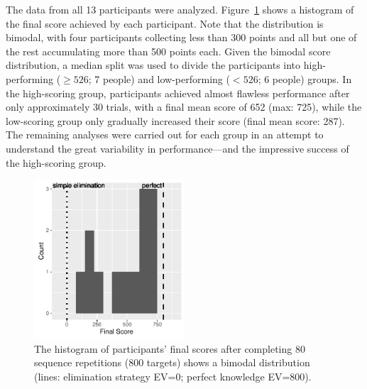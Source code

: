 \documentclass[man,floatsintext]{apa6}
\begin{document}



The data from all 13 participants were analyzed. Figure~\ref{fig:score-hist} shows a histogram of the final score achieved by each participant. Note that the distribution is bimodal, with four participants collecting less than 300 points and all but one of the rest accumulating more than 500 points each. Given the bimodal score distribution, a median split was used to divide the participants into high-performing ($\geq526$; 7 people) and low-performing ($<526$; 6 people) groups. In the high-scoring group, participants achieved almost flawless performance after only approximately 30 trials, with a final mean score of 652 (max: 725), while the low-scoring group only gradually increased their score (final mean score: 287). The remaining analyses were carried out for each group in an attempt to understand the great variability in performance---and the impressive success of the high-scoring group.

\begin{figure}[h]
  \centering
  \includegraphics[width=0.5\textwidth]{figures/hum_hist_final_score}
  \caption{The histogram of participants' final scores after completing 80 sequence repetitions (800 targets) shows a bimodal distribution (lines: elimination strategy EV=0; perfect knowledge EV=800).}
  \label{fig:score-hist}
\end{figure}
\vspace{-.1cm}
\end{document}
